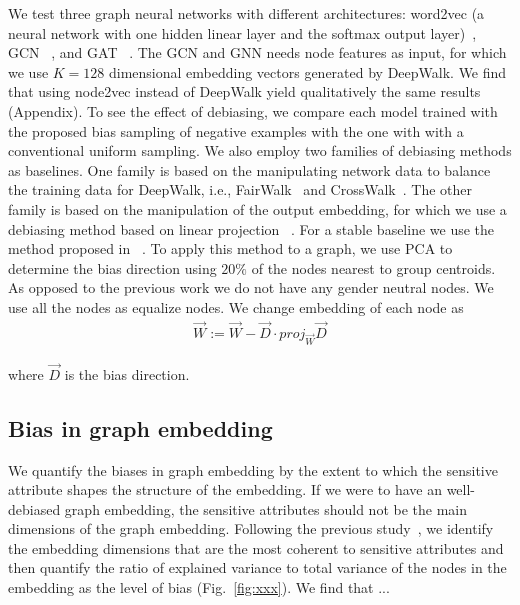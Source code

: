 \documentclass{article}
\theoremstyle{plain}
\theoremstyle{definition}
\theoremstyle{remark}
\begin{document}
We test three graph neural networks with different architectures: word2vec (a neural network with one hidden linear layer and the softmax output layer)~\cite{mikolovDistributedRepresentationsWords2013}, GCN ~\cite{kipf2017semisupervised}, and GAT ~\cite{velickovicGraphAttentionNetworks2022}.
The GCN and GNN needs node features as input, for which we 
use $K=128$ dimensional embedding vectors generated by DeepWalk.
We find that using node2vec instead of DeepWalk yield qualitatively the same results (Appendix).
To see the effect of debiasing, we compare each model trained with the proposed bias sampling of negative examples with the one with with a conventional uniform sampling.
We also employ two families of debiasing methods as baselines. 
One family is based on the manipulating network data to balance the training data for DeepWalk, i.e., FairWalk~\cite{rahmanFairwalkFairGraph2019} and CrossWalk~\cite{khajehnejadCrossWalkFairnessenhancedNode2022}.
The other family is based on the manipulation of the output embedding, for which we use a debiasing method based on linear projection ~\cite{DBLP:journals/corr/BolukbasiCZSK16a}. 
For a stable baseline we use the method proposed in ~\cite{DBLP:journals/corr/BolukbasiCZSK16a}. To apply this method to a graph, we use PCA to determine the bias direction using $20\%$ of the nodes nearest to group centroids. As opposed to the previous work we do not have any gender neutral nodes. We use all the nodes as equalize nodes. We change embedding of each node as
\begin{align}
\overrightarrow{W} := \overrightarrow{W} - \overrightarrow{D} \cdot \textit{proj}_{\overrightarrow{W}}\overrightarrow{D}
\end{align}

where $\overrightarrow{D}$ is the bias direction.
\subsection{Bias in graph embedding}

We quantify the biases in graph embedding by the extent to which the sensitive attribute shapes the structure of the embedding.
If we were to have an well-debiased graph embedding, the sensitive attributes should not be the main dimensions of the graph embedding.  
Following the previous study~\cite{DBLP:journals/corr/BolukbasiCZSK16a}, we identify the embedding dimensions that are the most coherent to sensitive attributes and then quantify the ratio of explained variance to total variance of the nodes in the embedding as the level of bias (Fig.~\ref{fig:xxx}).
We find that ...
\end{document}
